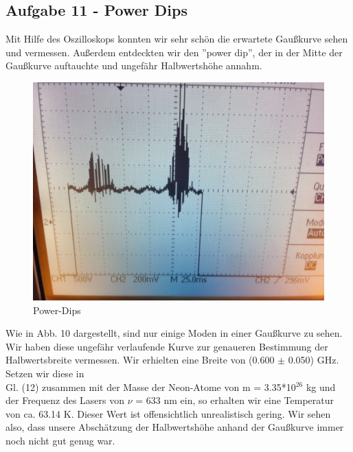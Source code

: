\subsection{Aufgabe 11 - Power Dips}

Mit Hilfe des Oszilloskops konnten wir sehr schön die erwartete Gaußkurve sehen und vermessen. Außerdem entdeckten wir den ''power dip'', der in der Mitte der Gaußkurve auftauchte und ungefähr Halbwertshöhe annahm. \\

\begin{figure}[h]
\begin{center}
\includegraphics[scale=0.05]{img/62}
\caption{Power-Dips}
\end{center}
\end{figure}

Wie in Abb. 10 dargestellt, sind nur einige Moden in einer Gaußkurve zu sehen. Wir haben diese ungefähr verlaufende Kurve zur genaueren Bestimmung der Halbwertsbreite vermessen. Wir erhielten eine Breite von (0.600 $\pm$ 0.050) GHz. Setzen wir diese in\\
Gl. (12) zusammen mit der Masse der Neon-Atome von m = 3.35*10$^{26}$ kg und der Frequenz des Lasers von $\nu$ = 633 nm ein, so erhalten wir eine Temperatur von ca. 63.14 K. Dieser Wert ist offensichtlich unrealistisch gering. Wir sehen also, dass unsere Abschätzung der Halbwertshöhe anhand der Gaußkurve immer noch nicht gut genug war.\\
